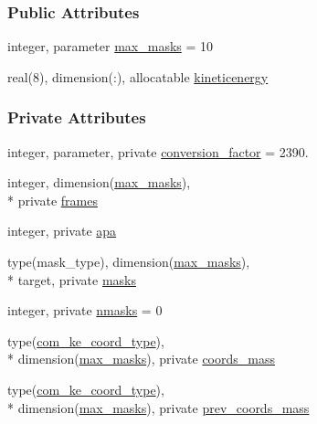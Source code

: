\subsubsection*{Public Attributes}
\begin{DoxyCompactItemize}
\item 
integer, parameter \hyperlink{classcalc__com__ke_aa0ccd626cbe2c83360fc3f3f322a49e3}{max\-\_\-masks} = 10
\item 
real(8), dimension(\-:), allocatable \hyperlink{classcalc__com__ke_a248bef710a3fedc054f7af9a972aaa5f}{kineticenergy}
\end{DoxyCompactItemize}
\subsubsection*{Private Attributes}
\begin{DoxyCompactItemize}
\item 
integer, parameter, private \hyperlink{classcalc__com__ke_afdf7cc08c8fb9e8f9a433c4919663503}{conversion\-\_\-factor} = 2390.
\item 
integer, dimension(\hyperlink{classcalc__com__ke_aa0ccd626cbe2c83360fc3f3f322a49e3}{max\-\_\-masks}), \\*
private \hyperlink{classcalc__com__ke_a1d9d59d1dc719a2be09f5b5484fdb8b1}{frames}
\item 
integer, private \hyperlink{classcalc__com__ke_a7be3639c20eb8ceb3a5180b4d48f22ab}{apa}
\item 
type(mask\-\_\-type), dimension(\hyperlink{classcalc__com__ke_aa0ccd626cbe2c83360fc3f3f322a49e3}{max\-\_\-masks}), \\*
target, private \hyperlink{classcalc__com__ke_a41821b7546d671ba29964180d9d536ed}{masks}
\item 
integer, private \hyperlink{classcalc__com__ke_a0c21c8581f9203021d13114bb2febf6f}{nmasks} = 0
\item 
type(\hyperlink{structcalc__com__ke_1_1com__ke__coord__type}{com\-\_\-ke\-\_\-coord\-\_\-type}), \\*
dimension(\hyperlink{classcalc__com__ke_aa0ccd626cbe2c83360fc3f3f322a49e3}{max\-\_\-masks}), private \hyperlink{classcalc__com__ke_a99b829fb93b7f8b50f1886f5cdc00cfe}{coords\-\_\-mass}
\item 
type(\hyperlink{structcalc__com__ke_1_1com__ke__coord__type}{com\-\_\-ke\-\_\-coord\-\_\-type}), \\*
dimension(\hyperlink{classcalc__com__ke_aa0ccd626cbe2c83360fc3f3f322a49e3}{max\-\_\-masks}), private \hyperlink{classcalc__com__ke_a5291cdd2e129d0f9af13b186501cb4be}{prev\-\_\-coords\-\_\-mass}

\end{DoxyCompactItemize}
